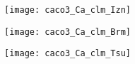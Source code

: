 \documentclass[final,dvips]{foils}
\begin{document}
\vspace{-0.5in}\large
\begin{figure}
\centering
\texttt{[image: caco3\_Ca\_clm\_Izn]}\vfill
\end{figure}

\foilhead{
\Large\textcolor{blue}{\hfill Near-Surface \Ca\ at Bermuda \hfill}}\vspace{-0.5in}\large
\begin{figure}
\centering
\texttt{[image: caco3\_Ca\_clm\_Brm]}\vfill
\end{figure}

\foilhead{
\Large\textcolor{blue}{\hfill Near-Surface \Ca\ at Tsushima \hfill}}\vspace{-0.5in}\large
\begin{figure}
\centering
\texttt{[image: caco3\_Ca\_clm\_Tsu]}\vfill
\end{figure}
\end{document}
